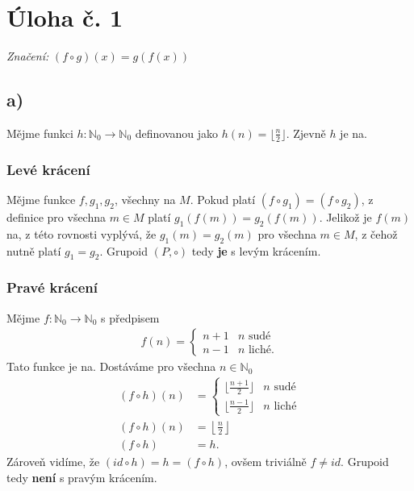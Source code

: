 \documentclass{scrartcl}
\begin{document}
    \section*{Úloha č. 1}
    \textit{Značení: } $(f \circ g)(x) = g(f(x))$
    \subsection*{a)}
    Mějme funkci $h: \mathbb{N}_0 \rightarrow \mathbb{N}_0$ definovanou jako $h(n) = \lfloor \frac{n}{2} \rfloor$. Zjevně $h$ je na.

    \subsubsection*{Levé krácení}
    Mějme funkce $f,g_1,g_2$, všechny na $M$. Pokud platí $(f \circ g_1) = (f \circ g_2)$, z definice pro všechna $m \in M$ platí $g_1(f(m)) = g_2(f(m))$. Jelikož je $f(m)$ na, z této rovnosti vyplývá, že $g_1(m) = g_2(m)$ pro všechna $m \in M$, z čehož nutně platí $g_1 = g_2$. Grupoid $(P,\circ)$ tedy \textbf{je} s levým krácením.

    \subsubsection*{Pravé krácení} 
    Mějme $f: \mathbb{N}_0 \rightarrow \mathbb{N}_0$ s předpisem
    \begin{align*}
        f(n) =
        \begin{cases}
            n+1 & n\text{ sudé} \\
            n-1 & n\text{ liché}.
        \end{cases} 
    \end{align*}
    Tato funkce je na. Dostáváme pro všechna $n \in \mathbb{N}_0$
    \begin{align*}
        (f \circ h)(n) &=
        \begin{cases}
            \lfloor \frac{n+1}{2} \rfloor & n \text{ sudé}\\
            \lfloor \frac{n-1}{2} \rfloor & n \text{ liché}
        \end{cases} \\
        (f \circ h)(n) &= \left\lfloor \frac{n}{2} \right\rfloor \\
        (f \circ h) &= h.
    \end{align*}
    Zároveň vidíme, že $(id \circ h) = h = (f \circ h)$, ovšem triviálně $f \neq id$. Grupoid tedy \textbf{není} s pravým krácením.
\end{document}
